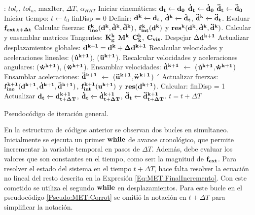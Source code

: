 \begin{algorithm}
	\begin{algorithmic} 
		\REQUIRE: $tol_r$, $tol_u$, $\text{maxIter}$, $\Delta T$, $\alpha_{HHT}$
		\STATE Iniciar cinemáticas: $\bf{d_t}\xleftarrow[]{}\bf{d_0}$
		$\bf{\dot{d}_t}\xleftarrow[]{}\bf{\dot{d}_0}$
		$\bf{\ddot{d}_t}\xleftarrow[]{}\bf{\ddot{d}_0}$ 
		\STATE Iniciar tiempo: $t\xleftarrow{}t_0$
		\STATE finDisp = $0$
		\STATE Definir: $\bf{d^k}\xleftarrow[]{}\bf{d_t}$, $\bf{\dot{d}^k}\xleftarrow[]{}\bf{\dot{d}_t}$, $\bf{\ddot{d}^k}\xleftarrow[]{}\bf{\ddot{d}_t}$.
		\STATE Evaluar $\bf{f_{ext,t+\Delta t}}$	
		\STATE Calcular fuerzas: $\bf{f}_{ine}^k(\bf{d}^k,\bf{\dot{d}}^k,\bf{\ddot{d}}^k)$,  $\bf{f}_{int}^k(\bf{d}^k)$ y $\bf{res}^{k}(\bf{d}^k,\bf{\dot{d}}^k,\bf{\ddot{d}}^k)$. 
		\STATE Calcular y ensamblar matrices Tangentes: $\bf{K}_g^k$ $\bf{M}^k$  $\bf{C}_k^k$, $\bf{C}_{vis}$. 
		\STATE Despejar $\Delta \bf{d}^{k+1}$ 
		\STATE Actualizar desplazamientos globales:  $\bf{d}^{k+1} = \bf{d}^{k} + \Delta\bf{d}^{k+1}$ 
		\STATE Recalcular velocidades y aceleraciones lineales: ($\bf{\dot{u}}^{k+1}$), ($\bf{\ddot{u}}^{k+1}$).
		\STATE Recalcular velocidades y aceleraciones angulares: ($\bf{\dot{w}}^{k+1}$), ($\bf{\ddot{w}}^{k+1}$).
		\STATE Ensamblar velocidades: $\bf{\dot{d}}^{k+1}$ $\leftarrow$ ($\bf{\dot{u}}^{k+1}$,$\bf{\dot{w}}^{k+1}$)
		\STATE Ensamblar aceleraciones: $\bf{\ddot{d}}^{k+1}$ $\leftarrow$ ($\bf{\ddot{u}}^{k+1}$,$\bf{\ddot{w}}^{k+1}$)
		´				\STATE Actualizar fuerzas: 	$\bf{f}_{ine}^{k+1}(\bf{d}^{k+1},\bf{\dot{d}}^{k+1},\bf{\ddot{d}}^{k+1})$,  $\bf{f}_{int}^{k+1}(\bf{u}^{k+1})$ y $\bf{res}(\bf{d}^{k+1})$. 
		\STATE Calcular: 
		\STATE finDisp = 1
		\ENDIF
		\ENDWHILE
		\STATE Actualizar $\bf{d_{t}}\xleftarrow[]{}\bf{d^{k+1}_{t+\Delta T}}$, $\bf{\dot{d}_{t}}\xleftarrow[]{}\bf{\dot{d}^{k+1}_{t+\Delta T}}$, $\bf{\ddot{d}_t}\xleftarrow[]{}\bf{\ddot{d}^{k+1}_{t+\Delta T}}$.
		\STATE $t = t+\Delta T$	
		\ENDWHILE
	\end{algorithmic}
	\caption{Pseudocódigo de iteración general. }
	\label{Pseudo:MET:Corrot}
\end{algorithm}

En la estructura de códigos anterior se observan dos bucles en simultaneo. Inicialmente se ejecuta un primer $\bf{while}$ de avance cronológico, que permite incrementar la variable temporal en pasos de $\Delta T$. Además, debe evaluar los valores que son constantes en el tiempo, como ser: la magnitud de $\bf{f}_{ext}$. Para resolver el estado del sistema en el tiempo $t+\Delta T$, hace falta resolver la ecuación no lineal del resto descrita en la Expresión \eqref{Eq:MET:FinalIncremento}. Con este cometido se utiliza el segundo $\bf{while}$ en desplazamientos. Para este bucle en el pseudocódigo \ref{Pseudo:MET:Corrot} se omitió la notación en $t+\Delta T$ para simplificar la notación.

